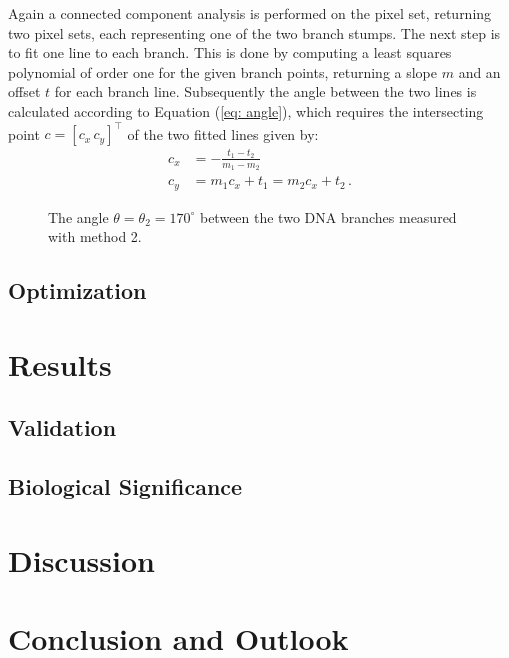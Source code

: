 \documentclass{article}
\begin{document}
  Again a connected component analysis is performed on the pixel set, returning two pixel sets, each representing one of the two branch stumps.
The next step is to fit one line to each branch. This is done by computing a least squares polynomial of order one for the given branch points, returning a slope $m$ and an offset $t$ for each branch line.
Subsequently the angle between the two lines is calculated according to Equation (\ref{eq: angle}), which requires the intersecting point $c = [c_x\, c_y]^{\top}$ of the two fitted lines given by:
\begin{align*}
c_x &= -\frac{t_1-t_2}{m_1-m_2}\\
c_y &= m_1 c_x + t_1 = m_2 c_x + t_2\, .
\end{align*}

\begin{figure}[htb!]
\centering
\def\svgwidth{0.5\textwidth}

\caption{The angle $\theta=\theta_2 = 170^{\circ}$ between the two DNA branches measured with method 2.}\label{fig: angle2}
\end{figure}


\subsection{Optimization}\label{sec:Optimization}
\section{Results}\label{sec: Results}
\subsection{Validation}\label{sec:Validation}
\subsection{Biological Significance}\label{sec: Biological Significance}
\section{Discussion}\label{sec: Discussion}
\section{Conclusion and Outlook}\label{sec: Conclusion and Outlook}

\newpage


\end{document}
